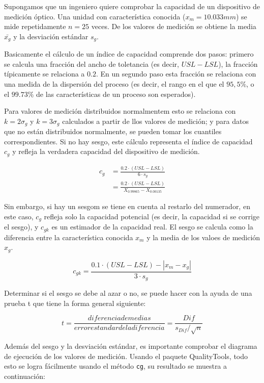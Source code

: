 \documentclass[
]{book}
\begin{document}
Supongamos que un ingeniero quiere comprobar la capacidad de un dispositivo de medición óptico. Una unidad con característica conocida (\(x_m = 10.033mm\)) se mide repetidamente \(n=25\) veces. De los valores de medición se obtiene la media \(\bar{x_g}\) y la desviación estándar \(s_g\).

Basicamente el cálculo de un índice de capacidad comprende dos pasos: primero se calcula una fracción del ancho de toletancia (es decir, \(USL - LSL\)), la fracción típicamente se relaciona a \(0.2\). En un segundo paso esta fracción se relaciona con una medida de la dispersión del proceso (es decir, el rango en el que el \(95,5\%\), o el \(99.73\%\) de las características de un proceso son esperados).

Para valores de medición distribuidos normalmentem esto se relaciona con \(k = 2 \sigma_g\) y \(k = 3 \sigma_g\) calculados a partir de llos valores de medición; y para datos que no están distribuidos normalmente, se pueden tomar los cuantiles correspondientes. Si no hay sesgo, este cálculo representa el índice de capacidad \(c_g\) y refleja la verdadera capacidad del dispositivo de medición.

\[
\begin{aligned}
c_g &= \frac{0.2 \cdot (USL - LSL)}{6 \cdot s_g} \\
    &= \frac{0.2 \cdot (USL - LSL)}{X_{0.99865} - X_{0.00135}}  
\end{aligned}
\]

Sin embargo, si hay un sesgom se tiene en cuenta al restarlo del numerador, en este caso, \(c_g\) refleja solo la capacidad potencial (es decir, la capacidad si se corrige el sesgo), y \(c_{gk}\) es un estimador de la capacidad real. El sesgo se calcula como la diferencia entre la característica conocida \(x_m\) y la media de los valoes de medición \(x_g\).

\[
c_{gk} = \frac{0.1 \cdot (USL - LSL) - |x_m - x_g|}{3 \cdot s_g}
\]

Determinar si el sesgo se debe al azar o no, se puede hacer con la ayuda de una prueba t que tiene la forma general siguiente:

\[
t = \frac{diferencia de medias}{error estandar de la diferencia} = \frac{Dif}{s_{Dif}/\sqrt{n}}
\]

Además del sesgo y la desviación estándar, es importante comprobar el diagrama de ejecución de los valores de medición. Usando el paquete QualityTools, todo esto se logra fácilmente usando el método \texttt{cg}, su resultado se muestra a continuación:
\end{document}
